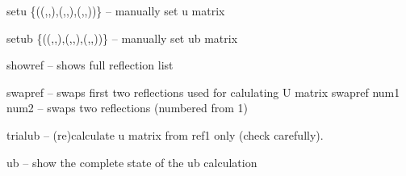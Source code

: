 \documentclass[letterpaper,10pt,english]{sphinxmanual}
\begin{document}

\begin{fulllineitems}
\label{Manual:commands.setu}
setu \{((,,),(,,),(,,))\} -- manually set u matrix

\end{fulllineitems}


\begin{fulllineitems}
\label{Manual:commands.setub}
setub \{((,,),(,,),(,,))\} -- manually set ub matrix

\end{fulllineitems}


\begin{fulllineitems}
\label{Manual:commands.showref}
showref -- shows full reflection list

\end{fulllineitems}


\begin{fulllineitems}
\label{Manual:commands.swapref}
swapref -- swaps first two reflections used for calulating U matrix
swapref num1 num2 -- swaps two reflections (numbered from 1)

\end{fulllineitems}


\begin{fulllineitems}
\label{Manual:commands.trialub}
trialub -- (re)calculate u matrix from ref1 only (check carefully).

\end{fulllineitems}


\begin{fulllineitems}
\label{Manual:commands.ub}
ub -- show the complete state of the ub calculation

\end{fulllineitems}
\end{document}
